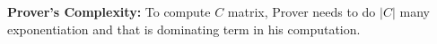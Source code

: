 \textbf{Prover's Complexity:}
 To compute $C$ matrix, Prover needs to do $|C|$ many exponentiation and that is dominating term in his computation.
 
 
 \begin{comment}
 \subsection{Zero-Knowledge:} We have three checks:
 \begin{itemize}
 	\item Interleaved Testing
 	\item Linear Check
 	\item Quadratic Check
 \end{itemize}
Note that during the interleaved testing, $w$ is sent to the verifier, where $w$ is the linear combination of all the rows of the encoding matrix, which verifier cannot compute on his own. So, it is required to blind the vector $w$ by adding an additional vector which is a codeword.\\

For Linear check, verifier is receiving the polynomial $q(\cdot)$, and can evaluates in many points which he should not learn on his own, verifier should learn only $\sum\limits_{c\in[l]}q(\zeta_c)$. To hide this, we will add a polynomial $\qb(\cdot)$ such that $\sum\limits_{c\in[l]}\qb(\zeta_c)=0$ and later $q_j(\eta_k)$ is opened to the verifier, hide this we need to add another polynomial to each $q_j(\cdot)$, say $\qbj(\cdot)$ such that $\qbj(\zeta_c)=0$ $\forall c\in [l]$. To achieve this we will include one slice where each row but the $(m+1)th$ is encoding of zero vector. and in the $(m+1)th$ row is the encodig of a vector which sums to 0.\\

Similarly for quadratic also, we need to include one slice where each row  is the encoding of zero vector.


\end{comment}
